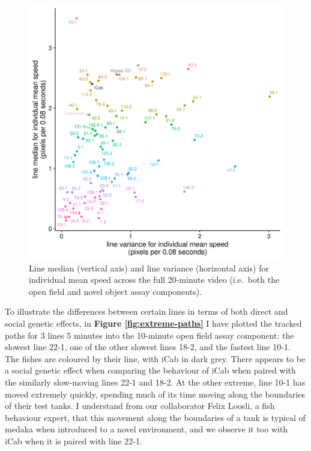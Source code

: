 \documentclass[
]{book}
\begin{document}
\begin{figure}
\includegraphics[width=1\linewidth]{figs/mikk_behaviour/line_mean_speed_variance_0.05_all} \caption{Line median (vertical axis) and line variance (horizontal axis) for individual mean speed across the full 20-minute video (i.e.~both the open field and novel object assay components).}\label{fig:mikk-mean-speed-variance}
\end{figure}

To illustrate the differences between certain lines in terms of both direct and social genetic effects, in \textbf{Figure \ref{fig:extreme-paths}} I have plotted the tracked paths for 3 lines 5 minutes into the 10-minute open field assay component: the slowest line \textcolor{22-1_FB737A}{22-1}, one of the other slowest lines \textcolor{18-2_FF66A6}{18-2}, and the fastest line \textcolor{10-1_F8766D}{10-1}. The fishes are coloured by their line, with \textcolor{iCab_424B4D}{iCab} in dark grey. There appears to be a social genetic effect when comparing the behaviour of \textcolor{iCab_424B4D}{iCab} when paired with the similarly slow-moving lines \textcolor{22-1_FB737A}{22-1} and \textcolor{18-2_FF66A6}{18-2}. At the other extreme, line \textcolor{10-1_F8766D}{10-1} has moved extremely quickly, spending much of its time moving along the boundaries of their test tanks. I understand from our collaborator Felix Loosli, a fish behaviour expert, that this movement along the boundaries of a tank is typical of medaka when introduced to a novel environment, and we observe it too with \textcolor{iCab_424B4D}{iCab} when it is paired with line \textcolor{22-1_FB737A}{22-1}.
\end{document}
